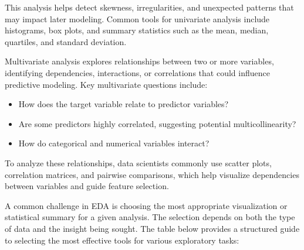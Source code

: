 \documentclass[
  11pt,
]{book}
\providecommand{\tightlist}{%
  \setlength{\itemsep}{0pt}\setlength{\parskip}{0pt}}
\theoremstyle{definition}
\theoremstyle{definition}
\theoremstyle{definition}
\theoremstyle{definition}
\theoremstyle{remark}
\begin{document}
This analysis helps detect skewness, irregularities, and unexpected patterns that may impact later modeling. Common tools for univariate analysis include histograms, box plots, and summary statistics such as the mean, median, quartiles, and standard deviation.

Multivariate analysis explores relationships between two or more variables, identifying dependencies, interactions, or correlations that could influence predictive modeling. Key multivariate questions include:

\begin{itemize}
\tightlist
\item
  How does the target variable relate to predictor variables?\\
\item
  Are some predictors highly correlated, suggesting potential multicollinearity?\\
\item
  How do categorical and numerical variables interact?
\end{itemize}

To analyze these relationships, data scientists commonly use scatter plots, correlation matrices, and pairwise comparisons, which help visualize dependencies between variables and guide feature selection.

A common challenge in EDA is choosing the most appropriate visualization or statistical summary for a given analysis. The selection depends on both the type of data and the insight being sought. The table below provides a structured guide to selecting the most effective tools for various exploratory tasks:
\end{document}

